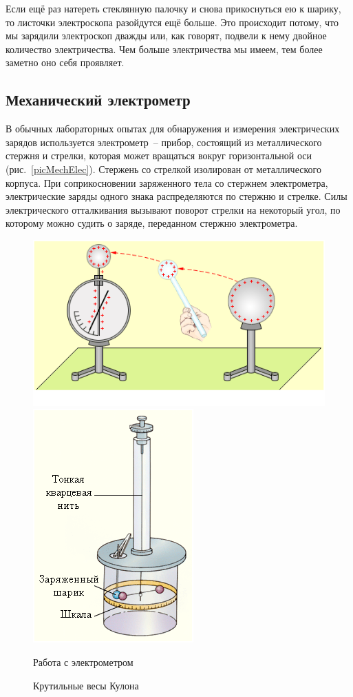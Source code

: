 \documentclass[pscyr,titlepage]{hedreport}
\begin{document}
  Если ещё раз натереть стеклянную палочку и снова прикоснуться ею к шарику, то
  листочки электроскопа разойдутся ещё больше. Это происходит потому, что мы
  зарядили электроскоп дважды или, как говорят, подвели к нему двойное
  количество электричества. Чем больше электричества мы имеем, тем более заметно
  оно себя проявляет.

  \subsection{Механический электрометр}
  В обычных лабораторных опытах для обнаружения и измерения электрических
  зарядов используется электрометр~-- прибор, состоящий из металлического
  стержня и стрелки, которая может вращаться вокруг горизонтальной оси
  (рис.~\ref{picMechElec}). Стержень со стрелкой изолирован от металлического
  корпуса. При соприкосновении заряженного тела со стержнем электрометра,
  электрические заряды одного знака распределяются по стержню и стрелке. Силы
  электрического отталкивания вызывают поворот стрелки на некоторый угол, по
  которому можно судить о заряде, переданном стержню электрометра.

  \begin{figure}[ht]
    \center
    \includegraphics[width=.65\textwidth]{sl_2_1} \hspace{1em}
    \includegraphics[width=.3\textwidth]{sl_2_2} \\
    \parbox{.65\textwidth}{\caption{Работа с электрометром} \label{picMechElec}}
    \hspace{1em}
    \parbox{.3\textwidth}{\caption{Крутильные весы Кулона} \label{picScales}}
  \end{figure}
\end{document}
